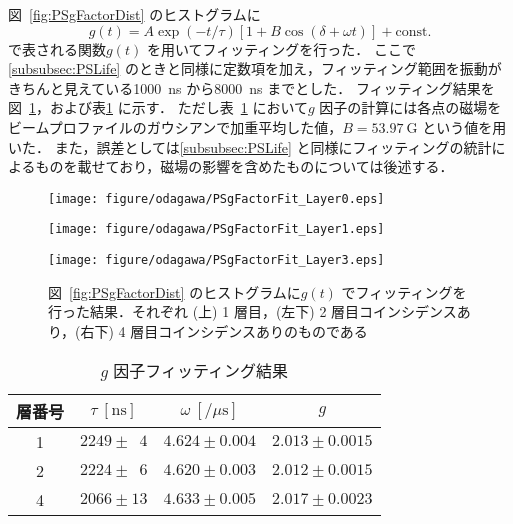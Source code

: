 図~\ref{fig:PSgFactorDist} のヒストグラムに%
\begin{equation}
g(t) = A \exp(-t / \tau) [1 + B \cos(\delta + \omega t)] + \mathrm{const.}
\label{eq:PSgFactorFitFunc}
\end{equation}
で表される関数$g(t)$ を用いてフィッティングを行った．
ここで\ref{subsubsec:PSLife} のときと同様に定数項を加え，フィッティング範囲を振動がきちんと見えている1000~ns から8000~ns までとした．
フィッティング結果を図~\ref{fig:PSgFactorFit}，および表\ref{tab:PSgFactor} に示す．
ただし表~\ref{tab:PSgFactor} において$g$ 因子の計算には各点の磁場をビームプロファイルのガウシアンで加重平均した値，$B = 53.97~\mathrm{G}$ という値を用いた．
また，誤差としては\ref{subsubsec:PSLife} と同様にフィッティングの統計によるものを載せており，磁場の影響を含めたものについては後述する．
\begin{figure}[h]
	\centering
	\texttt{[image: figure/odagawa/PSgFactorFit\_Layer0.eps]}\\
	\begin{minipage}{0.45\textwidth}
	\centering
	\texttt{[image: figure/odagawa/PSgFactorFit\_Layer1.eps]}
	\end{minipage}
	\begin{minipage}{0.45\textwidth}
	\centering
	\texttt{[image: figure/odagawa/PSgFactorFit\_Layer3.eps]}
	\end{minipage}
	\caption{図~\ref{fig:PSgFactorDist} のヒストグラムに$g(t)$ でフィッティングを行った結果．それぞれ (上) 1 層目，(左下) 2 層目コインシデンスあり，(右下) 4 層目コインシデンスありのものである}
	\label{fig:PSgFactorFit}
\end{figure}%
\begin{table}[h]
	\centering
	\caption{$g$ 因子フィッティング結果}
	\begin{tabular}{cccc} \toprule
	層番号 & $\tau~[\mathrm{ns}]$ & $\omega~[/ \mu\mathrm{s}]$ & $g$ \\ \midrule
	1 & $2249 \pm \phantom{0}4$ & $4.624 \pm 0.004$ & $2.013 \pm 0.0015$ \\  
	2 & $2224 \pm \phantom{0}6$ & $4.620 \pm 0.003$ & $2.012 \pm 0.0015$ \\  
	4 & $2066 \pm 13$ & $4.633 \pm 0.005$ & $2.017 \pm 0.0023$ \\  \bottomrule
	\end{tabular}\label{tab:PSgFactor}
\end{table}%

\newpage

